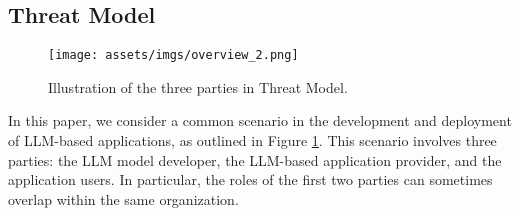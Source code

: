 \subsection{Threat Model} \label{sec:threat_model}
\begin{figure}[!t]
    \centering
    \texttt{[image: assets/imgs/overview\_2.png]}
    \caption{Illustration of the three parties in Threat Model.}
    \label{fig:overview}
\end{figure}
In this paper, we consider a common scenario in the development and deployment of LLM-based applications, as outlined in Figure \ref{fig:overview}. This scenario involves three parties: the LLM model developer, the LLM-based application provider, and the application users. In particular, the roles of the first two parties can sometimes overlap within the same organization.

